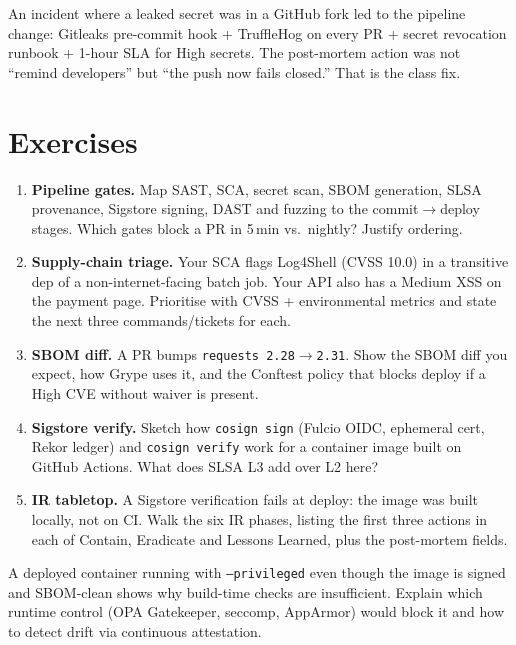 \begin{example}
An incident where a leaked secret was in a GitHub fork led to the pipeline change: Gitleaks pre-commit hook + TruffleHog on every PR + secret revocation runbook + 1-hour SLA for High secrets. The post-mortem action was not ``remind developers'' but ``the push now fails closed.'' That is the class fix.
\end{example}

\section{Exercises}
\label{sec:ch08-exercises}
\begin{enumerate}[label=E8.\arabic*, leftmargin=*, itemsep=0.6em]
    \item \textbf{Pipeline gates.} Map SAST, SCA, secret scan, SBOM generation, SLSA provenance, Sigstore signing, DAST and fuzzing to the commit$\to$deploy stages. Which gates block a PR in 5\,min vs.\ nightly? Justify ordering.
    \item \textbf{Supply-chain triage.} Your SCA flags Log4Shell (CVSS 10.0) in a transitive dep of a non-internet-facing batch job. Your API also has a Medium XSS on the payment page. Prioritise with CVSS + environmental metrics and state the next three commands/tickets for each.
    \item \textbf{SBOM diff.} A PR bumps \texttt{requests 2.28$\to$2.31}. Show the SBOM diff you expect, how Grype uses it, and the Conftest policy that blocks deploy if a High CVE without waiver is present.
    \item \textbf{Sigstore verify.} Sketch how \texttt{cosign sign} (Fulcio OIDC, ephemeral cert, Rekor ledger) and \texttt{cosign verify} work for a container image built on GitHub Actions. What does SLSA L3 add over L2 here?
    \item \textbf{IR tabletop.} A Sigstore verification fails at deploy: the image was built locally, not on CI. Walk the six IR phases, listing the first three actions in each of Contain, Eradicate and Lessons Learned, plus the post-mortem fields.
\end{enumerate}

\begin{remark}
A deployed container running with \texttt{--privileged} even though the image is signed and SBOM-clean shows why build-time checks are insufficient. Explain which runtime control (OPA Gatekeeper, seccomp, AppArmor) would block it and how to detect drift via continuous attestation.
\end{remark}


